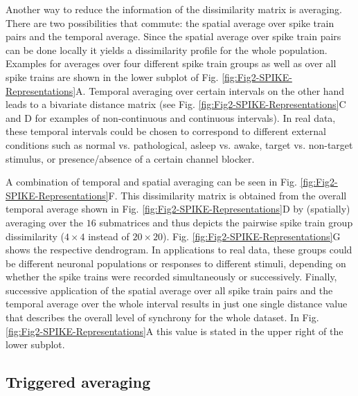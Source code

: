 \documentclass[10pt,twocolumn]{elsart5p}
\begin{document}
Another way to reduce the information of the dissimilarity matrix is averaging. There are two possibilities that commute: the spatial average over spike train pairs and the temporal average. Since the spatial average over spike train pairs can be done locally it yields a dissimilarity profile for the whole population. Examples for averages over four different spike train groups as well as over all spike trains are shown in the lower subplot of Fig. \ref{fig:Fig2-SPIKE-Representations}A. Temporal averaging over certain intervals on the other hand leads to a bivariate distance matrix (see Fig. \ref{fig:Fig2-SPIKE-Representations}C and D for examples of non-continuous and continuous intervals). In real data, these temporal intervals could be chosen to correspond to different external conditions such as normal vs. pathological, asleep vs. awake, target vs. non-target stimulus, or presence/absence of a certain channel blocker. 

A combination of temporal and spatial averaging can be seen in Fig. \ref{fig:Fig2-SPIKE-Representations}F. This dissimilarity matrix is obtained from the overall temporal average shown in Fig. \ref{fig:Fig2-SPIKE-Representations}D by (spatially) averaging over the $16$ submatrices and thus depicts the pairwise spike train group dissimilarity ($4 \times 4$ instead of $20 \times 20$). Fig. \ref{fig:Fig2-SPIKE-Representations}G shows the respective dendrogram. In applications to real data, these groups could be different neuronal populations or responses to different stimuli, depending on whether the spike trains were recorded simultaneously or successively. Finally, successive application of the spatial average over all spike train pairs and the temporal average over the whole interval results in just one single distance value that describes the overall level of synchrony for the whole dataset. In Fig. \ref{fig:Fig2-SPIKE-Representations}A this value is stated in the upper right of the lower subplot.


\subsection{\label{ss:Triggered-Averaging} Triggered averaging}
\end{document}
